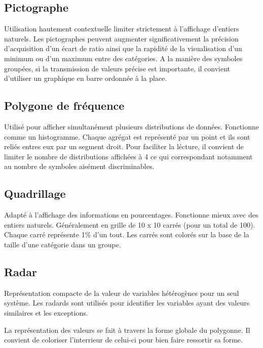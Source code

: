 \documentclass[a4paper,12pt]{article}
\begin{document}
\begin{multicols}{2}
\subsection*{Pictographe}
\label{sec:orgcdca799}
Utilisation hautement contextuelle limiter strictement à l'affichage d'entiers naturels. \autocite{alansmithLexiqueVisuel}
Les pictographes peuvent augmenter significativement la précision d'acquisition d'un écart de ratio ainsi que la rapidité de la visualisation d'un minimum ou d'un maximum entre des catégories. \autocite{tranDiscoveringAccessibleData2024} A la manière des symboles groupées, si la transmission de valeurs précise est importante, il convient d'utiliser un graphique en barre ordonnée à la place. \autocite{tranDiscoveringAccessibleData2024}
\subsection*{Polygone de fréquence}
\label{sec:orge88d2a4}
Utilisé pour afficher simultanément plusieurs distributions de données. Fonctionne comme un histogramme. Chaque agrégat est représenté par un point et ils sont reliés entres eux par un segment droit. Pour faciliter la lécture, il convient de limiter le nombre de distributions affichées à 4 \autocite{alansmithLexiqueVisuel} ce qui correspondant notamment au nombre de symboles aisément discriminables.
\subsection*{Quadrillage}
\label{sec:orgb95c4a8}
Adapté à l'affichage des informations en pourcentages. Fonctionne mieux avec des entiers naturels. \autocite{alansmithLexiqueVisuel} Généralement en grille de 10 x 10 carrés (pour un total de 100). Chaque carré représente 1\% d'un tout. Les carrés sont colorés sur la base de la taille d'une catégorie dans un groupe. \autocite{mikeyiHowChooseRight2020}
\subsection*{Radar}
\label{sec:org14f7dd5}
Représentation compacte de la valeur de variables hétérogènes pour un seul système. \autocite{alansmithLexiqueVisuel} Les radards sont utilisés pour identifier les variables ayant des valeurs similaires et les exceptions. \autocite{sosulskiGraphics2019}

La représentation des valeurs se fait à travers la forme globale du polygonne. Il convient de coloriser l'interrieur de celui-ci pour bien faire ressortir sa forme. \autocite{jonathanschwabishRelationship2021}


\end{multicols}
\end{document}
